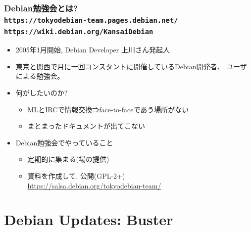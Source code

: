 \documentclass[cjk,c,squeeze,shrink,dvipdfmx,12pt]{beamer}
\begin{document}
\begin{frame}
  \frametitle{Debian勉強会とは?%
    \\[-.5em]{\normalsize{\texttt{https://tokyodebian-team.pages.debian.net/}}}%
    \\[-.5em]{\normalsize{\texttt{https://wiki.debian.org/KansaiDebian}}}%
  }
  \pause
  \begin{itemize}[<+->]
  \item
    2005年1月開始, Debian Developer 上川さん発起人
  \item
    東京と関西で月に一回コンスタントに開催しているDebian開発者、
    ユーザによる勉強会。
  \item
    何がしたいのか?
    \begin{itemize}[<+->]
    \item
      MLとIRCで情報交換⇒face-to-faceであう場所がない
    \item
      まとまったドキュメントが出てこない
    \end{itemize}
  \item
    Debian勉強会でやっていること
    \begin{itemize}[<+->]
    \item
      定期的に集まる(場の提供)
    \item
      資料を作成して, 公開(GPL-2+) \\
      {\small \url{https://salsa.debian.org/tokyodebian-team/}}
    \end{itemize}
  \end{itemize}

\end{frame}


\section{Debian Updates: Buster}

{%
  \begin{frame}
    \centering
  \end{frame}
}

\end{document}
